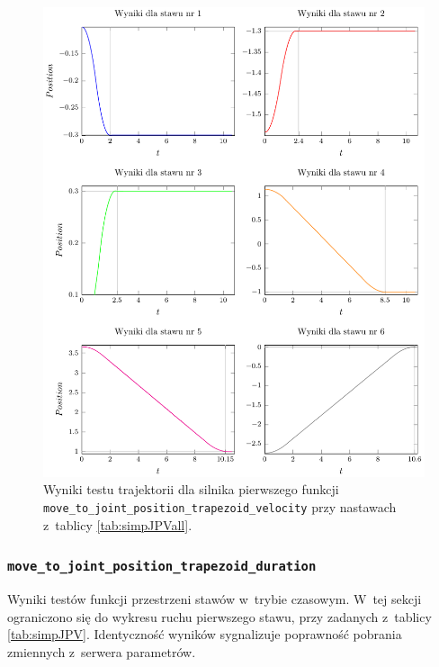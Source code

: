 \documentclass[a4paper, 12pt]{article}
\begin{document}
	\begin{figure}[H]
		\centering
		\includegraphics[scale=1.05]{raport_graphs/simpJPVall.pdf}
		\caption{Wyniki testu trajektorii dla silnika pierwszego funkcji \texttt{move\_to\_joint\_position\_trapezoid\_velocity} przy nastawach z~tablicy \ref{tab:simpJPVall}.}
		\label{fig:simpJPVall}
	\end{figure}
	
	\subsubsection{\texttt{move\_to\_joint\_position\_trapezoid\_duration}}
	Wyniki testów funkcji przestrzeni stawów w~trybie czasowym. W~tej sekcji ograniczono się do wykresu ruchu pierwszego stawu, przy zadanych z~tablicy \ref{tab:simpJPV}. Identyczność wyników sygnalizuje poprawność pobrania zmiennych z~serwera parametrów.
	
\end{document}

